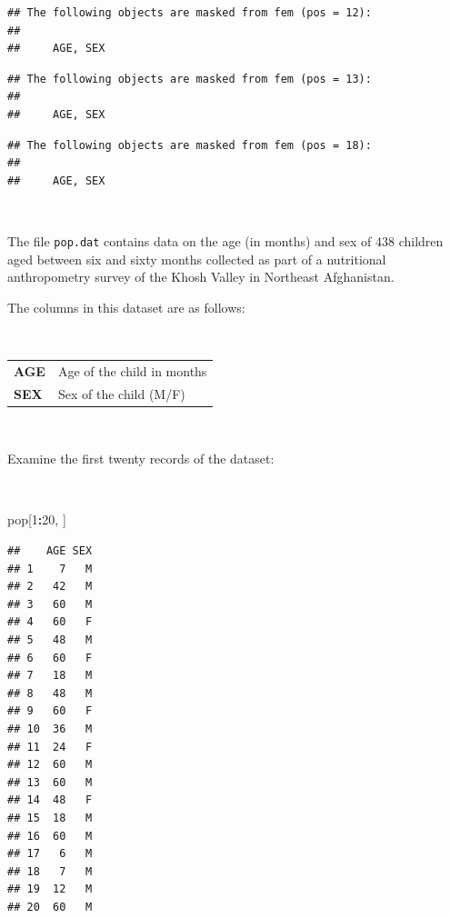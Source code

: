 \documentclass[12pt,a4paper]{book}
\newenvironment{Shaded}{\begin{snugshade}}{\end{snugshade}}
\newcommand{\DecValTok}[1]{\textcolor[rgb]{0.00,0.00,0.81}{#1}}
\newcommand{\NormalTok}[1]{#1}
\newcommand{\OperatorTok}[1]{\textcolor[rgb]{0.81,0.36,0.00}{\textbf{#1}}}
\theoremstyle{definition}
\theoremstyle{definition}
\theoremstyle{definition}
\theoremstyle{remark}
\begin{document}
\begin{verbatim}
## The following objects are masked from fem (pos = 12):
## 
##     AGE, SEX
\end{verbatim}

\begin{verbatim}
## The following objects are masked from fem (pos = 13):
## 
##     AGE, SEX
\end{verbatim}

\begin{verbatim}
## The following objects are masked from fem (pos = 18):
## 
##     AGE, SEX
\end{verbatim}

~

The file \texttt{pop.dat} contains data on the age (in months) and sex
of 438 children aged between six and sixty months collected as part of a
nutritional anthropometry survey of the Khosh Valley in Northeast
Afghanistan.

The columns in this dataset are as follows:

~

\begin{longtable}[]{@{}ll@{}}
\toprule
\endhead
\begin{minipage}[t]{0.14\columnwidth}\raggedright
\textbf{AGE}\strut
\end{minipage} & \begin{minipage}[t]{0.38\columnwidth}\raggedright
Age of the child in months\strut
\end{minipage}\tabularnewline
\begin{minipage}[t]{0.14\columnwidth}\raggedright
\textbf{SEX}\strut
\end{minipage} & \begin{minipage}[t]{0.38\columnwidth}\raggedright
Sex of the child (M/F)\strut
\end{minipage}\tabularnewline
\bottomrule
\end{longtable}

~

Examine the first twenty records of the dataset:

~

\begin{Shaded}
\begin{Highlighting}[]
\NormalTok{pop[}\DecValTok{1}\OperatorTok{:}\DecValTok{20}\NormalTok{, ]}
\end{Highlighting}
\end{Shaded}

\begin{verbatim}
##    AGE SEX
## 1    7   M
## 2   42   M
## 3   60   M
## 4   60   F
## 5   48   M
## 6   60   F
## 7   18   M
## 8   48   M
## 9   60   F
## 10  36   M
## 11  24   F
## 12  60   M
## 13  60   M
## 14  48   F
## 15  18   M
## 16  60   M
## 17   6   M
## 18   7   M
## 19  12   M
## 20  60   M
\end{verbatim}
\end{document}

